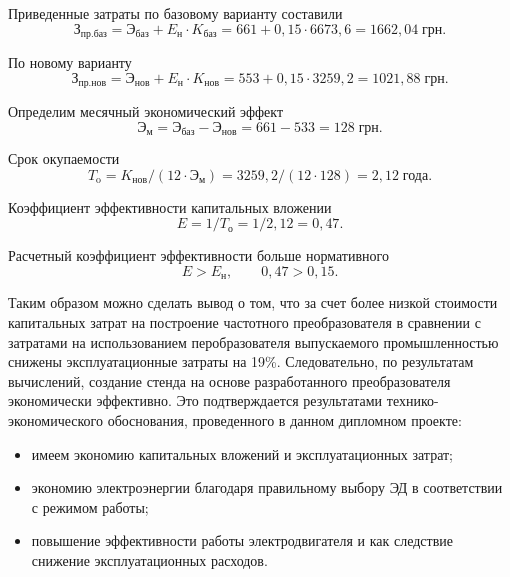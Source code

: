         Приведенные затраты по базовому варианту составили
        \begin{equation*}
            \text{З}_\text{пр.баз} = 
                \text{Э}_\text{баз} + E_\text{н} \cdot K_\text{баз} = 
                    661 + 0,15 \cdot 6673,6 = 1662,04 \; \text{грн}.
        \end{equation*}

        По новому варианту
        \begin{equation*}
            \text{З}_\text{пр.нов} = 
                \text{Э}_\text{нов} + E_\text{н} \cdot K_\text{нов} = 
                    553 + 0,15 \cdot 3259,2 = 1021,88 \; \text{грн}.
        \end{equation*}

        Определим месячный экономический эффект
        \begin{equation*}
            \text{Э}_\text{м} = \text{Э}_\text{баз} 
                - \text{Э}_\text{нов} = 661 - 533 = 128 \; \text{грн}.
        \end{equation*}

        Срок окупаемости
        \begin{equation*}
            T_\text{o} = K_\text{нов}/(12 \cdot \text{Э}_\text{м})
                = 3259,2 / (12 \cdot 128) = 2,12 \; \text{года}.
        \end{equation*}

        Коэффициент эффективности капитальных вложении
        \begin{equation*}
            E = 1 / T_\text{о} = 1 / 2,12 = 0,47.
        \end{equation*}

       Расчетный коэффициент эффективности больше нормативного 
        \begin{equation*}
            E > E_\text{н},\qquad 0,47 > 0,15. 
        \end{equation*}

        Таким образом можно сделать вывод о том, что за счет более низкой
        стоимости капитальных затрат на построение частотного преобразователя в
        сравнении с затратами на использованием перобразователя выпускаемого
        промышленностью снижены эксплуатационные затраты на 19\%.
        Следовательно, по результатам вычислений, создание стенда на основе
        разработанного преобразователя экономически эффективно. Это
        подтверждается результатами технико-экономического обоснования,
        проведенного в данном дипломном проекте:
        \begin{itemize}
            \item имеем экономию капитальных вложений и эксплуатационных
                затрат;
            \item экономию электроэнергии благодаря правильному выбору ЭД в
                соответствии с режимом работы;
            \item повышение эффективности работы электродвигателя и как
                следствие снижение эксплуатационных расходов.
        \end{itemize}

